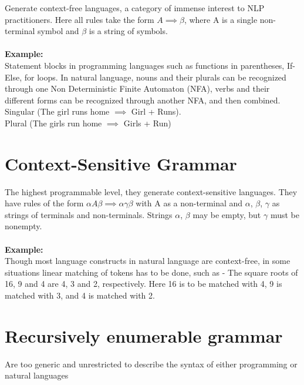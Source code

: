 \documentclass[
	12pt, %
]{fphw}
\begin{document}
Generate context-free languages, a category of immense interest to NLP practitioners. Here all rules take the form $A \implies \beta$, where A is a single non-terminal symbol and $\beta$ is a string of symbols.\\\\

\textbf{Example:}\\

Statement blocks in programming languages such as functions in parentheses, If-Else, for loops. In natural language, nouns and their plurals can be recognized through one Non Deterministic Finite Automaton (NFA), verbs and their different forms can be recognized through another NFA, and then combined. \\Singular (The girl runs home $\implies$ Girl + Runs). \\Plural (The girls run home $\implies$ Girls + Run)


\section*{{\color{Cerulean}Context-Sensitive Grammar}}
The highest programmable level, they generate context-sensitive languages. They have rules of the form $\alpha A \beta \implies \alpha \gamma \beta$ with A as a non-terminal and $\alpha$, $\beta$, $\gamma$ as strings of terminals and non-terminals. Strings $\alpha$, $\beta$ may be empty, but $\gamma$ must be nonempty.\\\\

\textbf{Example:}\\

Though most language constructs in natural language are context-free, in some situations linear matching of tokens has to be done, such as - The square roots of 16, 9 and 4 are 4, 3 and 2, respectively. Here 16 is to be matched with 4, 9 is matched with 3, and 4 is matched with 2.

\section*{{\color{RoyalPurple}Recursively enumerable grammar}}
Are too generic and unrestricted to describe the syntax of either programming or natural languages\\\\
\end{document}
